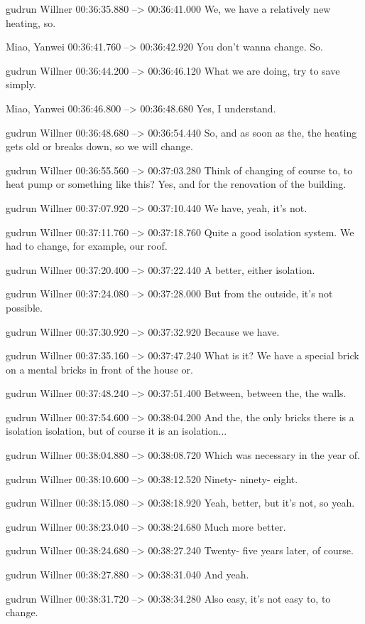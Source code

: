 {gudrun Willner 00:36:35.880 --> 00:36:41.000
We, we have a relatively new heating, so.

Miao, Yanwei 00:36:41.760 --> 00:36:42.920
You don't wanna change. So.

gudrun Willner 00:36:44.200 --> 00:36:46.120
What we are doing, try to save simply.

Miao, Yanwei 00:36:46.800 --> 00:36:48.680
Yes, I understand.

gudrun Willner 00:36:48.680 --> 00:36:54.440
So, and as soon as the, the heating gets old or breaks down, so we will change.

gudrun Willner 00:36:55.560 --> 00:37:03.280
Think of changing of course to, to heat pump or something like this? Yes, and for the renovation of the building.

gudrun Willner 00:37:07.920 --> 00:37:10.440
We have, yeah, it's not.

gudrun Willner 00:37:11.760 --> 00:37:18.760
Quite a good isolation system. We had to change, for example, our roof.

gudrun Willner 00:37:20.400 --> 00:37:22.440
A better, either isolation.

gudrun Willner 00:37:24.080 --> 00:37:28.000
But from the outside, it's not possible.

gudrun Willner 00:37:30.920 --> 00:37:32.920
Because we have.

gudrun Willner 00:37:35.160 --> 00:37:47.240
What is it? We have a special brick on a mental bricks in front of the house or.

gudrun Willner 00:37:48.240 --> 00:37:51.400
Between, between the, the walls.

gudrun Willner 00:37:54.600 --> 00:38:04.200
And the, the only bricks there is a isolation isolation, but of course it is an isolation...

gudrun Willner 00:38:04.880 --> 00:38:08.720
Which was necessary in the year of.

gudrun Willner 00:38:10.600 --> 00:38:12.520
Ninety- ninety- eight.

gudrun Willner 00:38:15.080 --> 00:38:18.920
Yeah, better, but it's not, so yeah.

gudrun Willner 00:38:23.040 --> 00:38:24.680
Much more better.

gudrun Willner 00:38:24.680 --> 00:38:27.240
Twenty- five years later, of course.

gudrun Willner 00:38:27.880 --> 00:38:31.040
And yeah.

gudrun Willner 00:38:31.720 --> 00:38:34.280
Also easy, it's not easy to, to change.

}
